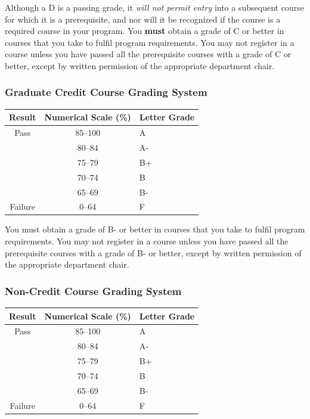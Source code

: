 \documentclass{article}
\begin{document}
Although a D is a passing grade, it {\em will not permit entry} into a
subsequent course for which it is a prerequisite, and nor will it be
recognized if the course is a required course in your program. You
{\bf must} obtain a grade of C or better in courses that you take to
fulfil program requirements. You may not register in a course unless
you have passed all the prerequisite courses with a grade of C or
better, except by written permission of the appropriate department
chair.

\subsubsection{Graduate Credit Course Grading System}


\begin{center}
  \begin{tabular}{ccl}
     Result & Numerical Scale (\%) & Letter Grade \\
   \hline
Pass & 85--100 & A  \\
& 80--84 & A- \\
& 75--79 & B+ \\
& 70--74 & B \\
& 65--69 & B- \\
\hline
Failure & 0--64 & F
  \end{tabular}
  \end{center}

You must obtain a grade of B- or better in courses that you take to
fulfil program requirements. You may not register in a course unless you
have passed all the prerequisite courses with a grade of B- or better,
except by written permission of the appropriate department chair.

\subsubsection{Non-Credit Course Grading System}

\begin{center}
  \begin{tabular}{ccl}
     Result & Numerical Scale (\%) & Letter Grade \\
   \hline
Pass & 85--100 & A  \\
& 80--84 & A- \\
& 75--79 & B+ \\
& 70--74 & B \\
& 65--69 & B- \\
\hline
Failure & 0--64 & F
  \end{tabular}
  \end{center}
\end{document}
